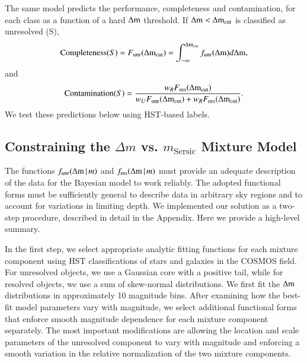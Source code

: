 The same model predicts the performance, completeness and contamination, for each class
as a function of a hard $\mathrm{\Delta m}$ threshold. If $\mathrm{\Delta m}<\mathrm{\Delta m}_{\rm cut}$ is classified as unresolved (S),
\begin{equation}
      {\rm Completeness}(S)=   F_{\rm unr}(\mathrm{\Delta m}_{\rm cut}) =  \int_{-\infty}^{\mathrm{\Delta m}_{\rm cut}}f_{\rm unr} (\mathrm{\Delta m}) d\mathrm{\Delta m},
      \label{eq:complS} 
\end{equation}                                       
and
\begin{equation}
       {\rm Contamination}(S) = \frac{w_R  F_{\rm res}(\mathrm{\Delta m}_{\rm cut}) }
       {w_U  F_{\rm unr}(\mathrm{\Delta m}_{\rm cut}) + w_R  F_{\rm res}(\mathrm{\Delta m}_{\rm cut})}.
       \label{eq:contS} 
\end{equation}
We test these predictions below using HST-based labels.



\subsection{Constraining the \(\Delta m\) vs. \(m_{\mathrm{Sersic}}\) Mixture Model  \label{sec:mixmodel2}} 

The functions $f_{\rm unr} (\mathrm{\Delta m} \,|\, m)$ and $f_{\rm res} (\mathrm{\Delta m}\,|\, m)$ must provide an adequate description of
the data for the Bayesian model to work reliably. The adopted functional forms must be sufficiently
general to describe data in arbitrary sky regions and to account for variations in limiting
depth. We implemented our solution as a two-step procedure, described in detail in the
Appendix. Here we provide a high-level summary.
 
In the first step, we select appropriate analytic fitting functions for each mixture component using
HST classifications of stars and galaxies in the COSMOS field. For unresolved objects, we use a
Gaussian core with a positive tail, while for resolved objects, we use a sum of skew-normal
distributions. We first fit the \(\mathrm{\Delta m}\) distributions in approximately 10 magnitude bins. After
examining how the best-fit model parameters vary with magnitude, we select additional functional
forms that enforce smooth magnitude dependence for each mixture component separately. The most
important modifications are allowing the location and scale parameters of the unresolved component
to vary with magnitude and enforcing a smooth variation in the relative normalization of the two
mixture components.

